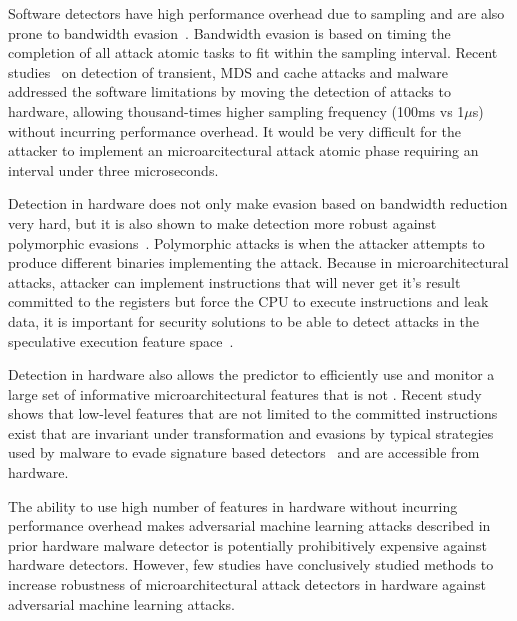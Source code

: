  
Software detectors have high performance overhead due to sampling and are also prone to bandwidth evasion~\cite{Gaudiot2020, PerSpectron}. Bandwidth evasion is based on timing the completion of all attack atomic 
tasks to fit within the sampling interval. Recent studies~\cite{PerSpectron, cyclone2019} on detection of transient, MDS and cache attacks and malware~\cite{Malware2015, ensembleRaid2015,kazdagli-16,RHMD2017} addressed the software limitations by moving the detection of
attacks to hardware, allowing thousand-times higher sampling frequency (100ms vs 1$\mu$s) without incurring performance overhead. It would be very difficult for the attacker to implement an microarcitectural attack atomic phase requiring an interval under three microseconds. 

Detection in hardware does not only make evasion based on bandwidth reduction very hard, but it is also shown to make detection more robust against polymorphic evasions~\cite{PerSpectron, cyclone2019, RHMD2017}. Polymorphic attacks is when the attacker attempts to produce different binaries implementing the attack. Because in microarchitectural attacks, attacker can implement instructions that will never get it’s result committed to the registers but force the CPU to execute instructions and leak data, it is important for security solutions 
to be able to detect attacks in the speculative execution feature 
space~\cite{wampler-19, PerSpectron}. 



Detection in hardware also allows the predictor to efficiently use and monitor a large set of informative microarchitectural features that is not . Recent study~\cite{PerSpectron} shows that low-level  features that are not limited to the committed instructions exist that are invariant under transformation and evasions by typical strategies
used by malware to evade signature based detectors~\cite{PaulKocher,paulKocherSpectreAttacks} and are accessible from hardware. 

The ability to use high number of features in hardware without incurring performance overhead makes adversarial machine learning attacks
described in prior hardware malware detector is potentially prohibitively expensive against hardware detectors.
However, few studies have conclusively studied methods to increase robustness of  microarchitectural attack detectors in hardware against adversarial machine learning attacks. 


